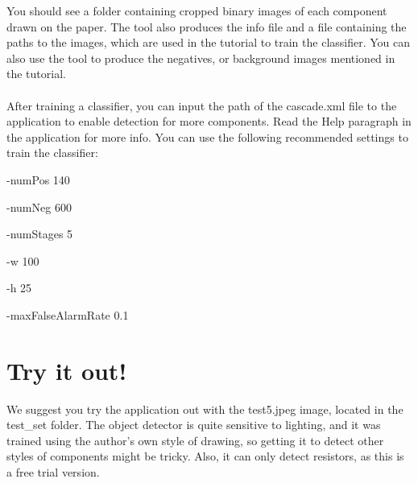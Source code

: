 \documentclass{article}
\begin{document}
You should see a folder containing cropped binary images of each component drawn on the paper. The tool also produces the info file and a file containing the paths to the images, which are used in the tutorial to train the classifier. You can also use the tool to produce the negatives, or background images mentioned in the tutorial.

\paragraph{}
After training a classifier, you can input the path of the cascade.xml file to the application to enable detection for more components. Read the Help paragraph in the application for more info. You can use the following recommended settings to train the classifier:

-numPos 140

-numNeg 600

-numStages 5

-w 100

-h 25

-maxFalseAlarmRate 0.1

\section{Try it out!}
We suggest you try the application out with the test5.jpeg image, located in the test\_set folder. The object detector is quite sensitive to lighting, and it was trained using the author's own style of drawing, so getting it to detect other styles of components might be tricky. Also, it can only detect resistors, as this is a free trial version.
\end{document}

